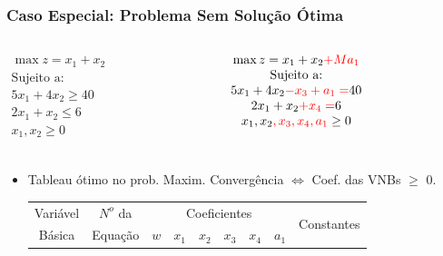 \documentclass{beamer}
\begin{document}
\begin{frame}
	\frametitle{Caso Especial: Problema Sem Solução Ótima}
	\begin{columns}
		\centering
		\begin{column}{5cm}
			\begin{mdframed}[backgroundcolor=black!20]
				\centering
				\scriptsize
				$	\begin{matrix}
						\max z = x_1 + x_2\\
						\text{Sujeito a:} \\
						5x_1 + 4x_2 \ge 40 \\
						2x_1 + x_2 \le 6 \\
						x_1, x_2 \ge 0 \\
					\end{matrix}
				$			
			\end{mdframed}
		\end{column}  \pause
		\begin{column}{5cm}
			\begin{mdframed}[backgroundcolor=yellow!70]
				\centering
				\scriptsize
				$	\begin{matrix}
						\max z = x_1 + x_2 {\color{red}+Ma_1}\\
						\text{Sujeito a:} \\
						5x_1 + 4x_2 {\color{red} - x_3 + a_1 =} 40 \\
						2x_1 + x_2 {\color{red} + x_4 =} 6 \\
						x_1, x_2{\color{red} ,x_3,x_4,a_1} \ge 0 \\
					\end{matrix}
				$			
			\end{mdframed}
		\end{column}  \pause
	\end{columns}
	\begin{itemize}
		\item {Tableau ótimo no prob. Maxim. Convergência $\Leftrightarrow$ Coef. das VNBs $\ge$ 0.}
		\begin{table}
			\scriptsize
			\newcommand{\azbr}{\cellcolor{blue!70} \color{white}}
			\newcommand{\azvm}{\cellcolor{blue!70} \color{red}}
			\newcommand{\ampr}{\cellcolor{yellow!70} \color{black}}
			\newcommand{\amvm}{\cellcolor{yellow!70} \color{red}}
			\begin{tabular}{ c  c  c  c  c  c  c  c c }
			\azbr Variável & \azbr $N^o$ da & \multicolumn{6}{c}{\azbr Coeficientes} & \multirow{2}{1.5cm}{\azbr  Constantes} \\[3pt]
			\azbr Básica   & \azbr Equação  & \azbr $w$ & \azbr  $x_1$ & \azvm $x_2$ & \azbr $x_3$ & \azbr $x_4$ & \azvm $a_1$ & \azbr          \\[3pt]

\end{tabular}
\end{table}
\end{itemize}
\end{frame}
\end{document}
